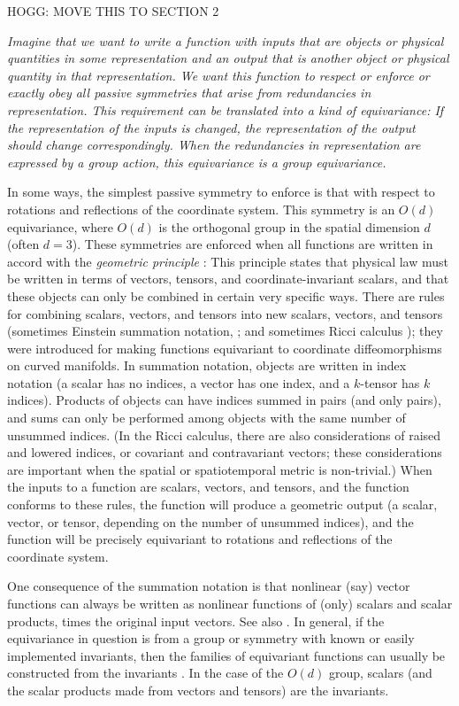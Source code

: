 \documentclass{article}
\theoremstyle{plain}
\theoremstyle{definition}
\theoremstyle{remark}
\begin{document}
HOGG: MOVE THIS TO SECTION 2
{\em Imagine that we want to write a function with inputs that are objects or physical quantities in some representation and an output that is another object or physical quantity in that representation.
We want this function to respect or enforce or exactly obey all passive symmetries that arise from redundancies in representation.
This requirement can be translated into a kind of \emph{equivariance}:
If the representation of the inputs is changed, the representation of the output should change correspondingly.
When the redundancies in representation are expressed by a group action, this equivariance is a group equivariance.

In some ways, the simplest passive symmetry to enforce is that with respect to rotations and reflections of the coordinate system.
This symmetry is an $O(d)$ equivariance, where $O(d)$ is the orthogonal group in the spatial dimension $d$ (often $d=3$).
These symmetries are enforced when all functions are written in accord with the \emph{geometric principle} \cite{mcp}:
This principle states that physical law must be written in terms of vectors, tensors, and coordinate-invariant scalars, and that these objects can only be combined in certain very specific ways.
There are rules for combining scalars, vectors, and tensors into new scalars, vectors, and tensors (sometimes Einstein summation notation, \citealt{einstein}; and sometimes Ricci calculus \citealt{ricci}); they were introduced for making functions equivariant to coordinate diffeomorphisms on curved manifolds.
In summation notation, objects are written in index notation (a scalar has no indices, a vector has one index, and a $k$-tensor has $k$ indices).
Products of objects can have indices summed in pairs (and only pairs), and sums can only be performed among objects with the same number of unsummed indices.
(In the Ricci calculus, there are also considerations of raised and lowered indices, or covariant and contravariant vectors; these considerations are important when the spatial or spatiotemporal metric is non-trivial.)
When the inputs to a function are scalars, vectors, and tensors, and the function conforms to these rules, the function will produce a geometric output (a scalar, vector, or tensor, depending on the number of unsummed indices), and the function will be precisely equivariant to rotations and reflections of the coordinate system.

One consequence of the summation notation is that nonlinear (say) vector functions can always be written as nonlinear functions of (only) scalars and scalar products, times the original input vectors.
See also \cite{villar2021scalars}.
In general, if the equivariance in question is from a group or symmetry with known or easily implemented invariants, then the families of equivariant functions can usually be constructed from the invariants \cite{blum2022equivariant}.
In the case of the $O(d)$ group, scalars (and the scalar products made from vectors and tensors) are the invariants.

}
\end{document}
